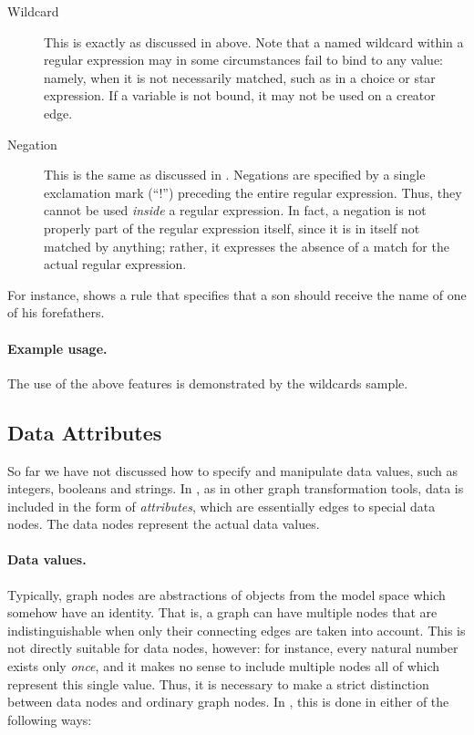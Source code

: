 \begin{description}
\item[Wildcard] This is exactly as discussed in  above.  Note
  that a named wildcard within a regular expression may in some circumstances
  fail to bind to any value: namely, when it is not necessarily matched, such
  as in a choice or star expression. If a variable is not bound, it may not be
  used on a creator edge.

\item[Negation] This is the same as discussed in . Negations
  are specified by a single exclamation mark (``\textsf{!}'') preceding the
  entire regular expression. Thus, they cannot be used \emph{inside} a
  regular expression. In fact, a negation is not properly part of the regular
  expression itself, since it is in itself not matched by anything; rather, it
  expresses the absence of a match for the actual regular expression.
\end{description}

For instance,  shows a rule that specifies that a son should
 receive the name of one of his forefathers.


\paragraph{Example usage.}

The use of the above features is demonstrated by the \Groove \textsf{wildcards}
sample.

\subsection{Data Attributes}

So far we have not discussed how to specify and manipulate data values, such as
integers, booleans and strings. In \Groove, as in other graph transformation
tools, data is included in the form of \emph{attributes}, which are essentially
edges to special data nodes. The data nodes represent the actual data values.

\paragraph{Data values.}

Typically, graph nodes are abstractions of objects from the model space which
somehow have an identity. That is, a graph can have multiple nodes that are
indistinguishable when only their connecting edges are taken into account. This
is not directly suitable for data nodes, however: for instance, every natural
number exists only \emph{once}, and it makes no sense to include multiple nodes
all of which represent this single value. Thus, it is necessary to make a
strict distinction between data nodes and ordinary graph nodes. In \Groove,
this is done in either of the following ways:

